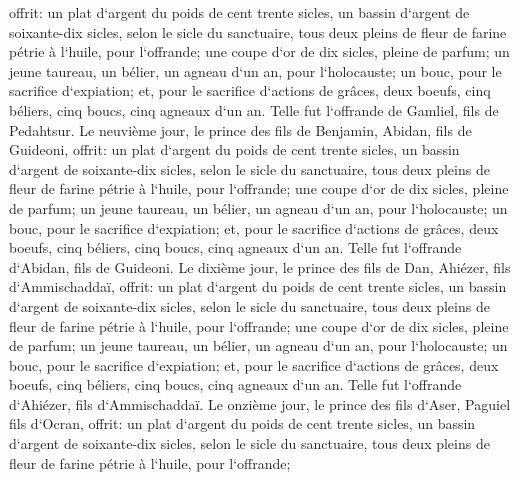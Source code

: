 \verse offrit: un plat d`argent du poids de cent trente sicles, un bassin d`argent de soixante-dix sicles, selon le sicle du sanctuaire, tous deux pleins de fleur de farine pétrie à l`huile, pour l`offrande; 
\verse une coupe d`or de dix sicles, pleine de parfum; 
\verse un jeune taureau, un bélier, un agneau d`un an, pour l`holocauste; 
\verse un bouc, pour le sacrifice d`expiation; 
\verse et, pour le sacrifice d`actions de grâces, deux boeufs, cinq béliers, cinq boucs, cinq agneaux d`un an. Telle fut l`offrande de Gamliel, fils de Pedahtsur. 
\verse Le neuvième jour, le prince des fils de Benjamin, Abidan, fils de Guideoni, 
\verse offrit: un plat d`argent du poids de cent trente sicles, un bassin d`argent de soixante-dix sicles, selon le sicle du sanctuaire, tous deux pleins de fleur de farine pétrie à l`huile, pour l`offrande; 
\verse une coupe d`or de dix sicles, pleine de parfum; 
\verse un jeune taureau, un bélier, un agneau d`un an, pour l`holocauste; 
\verse un bouc, pour le sacrifice d`expiation; 
\verse et, pour le sacrifice d`actions de grâces, deux boeufs, cinq béliers, cinq boucs, cinq agneaux d`un an. Telle fut l`offrande d`Abidan, fils de Guideoni. 
\verse Le dixième jour, le prince des fils de Dan, Ahiézer, fils d`Ammischaddaï, 
\verse offrit: un plat d`argent du poids de cent trente sicles, un bassin d`argent de soixante-dix sicles, selon le sicle du sanctuaire, tous deux pleins de fleur de farine pétrie à l`huile, pour l`offrande; 
\verse une coupe d`or de dix sicles, pleine de parfum; 
\verse un jeune taureau, un bélier, un agneau d`un an, pour l`holocauste; 
\verse un bouc, pour le sacrifice d`expiation; 
\verse et, pour le sacrifice d`actions de grâces, deux boeufs, cinq béliers, cinq boucs, cinq agneaux d`un an. Telle fut l`offrande d`Ahiézer, fils d`Ammischaddaï. 
\verse Le onzième jour, le prince des fils d`Aser, Paguiel fils d`Ocran, 
\verse offrit: un plat d`argent du poids de cent trente sicles, un bassin d`argent de soixante-dix sicles, selon le sicle du sanctuaire, tous deux pleins de fleur de farine pétrie à l`huile, pour l`offrande; 
